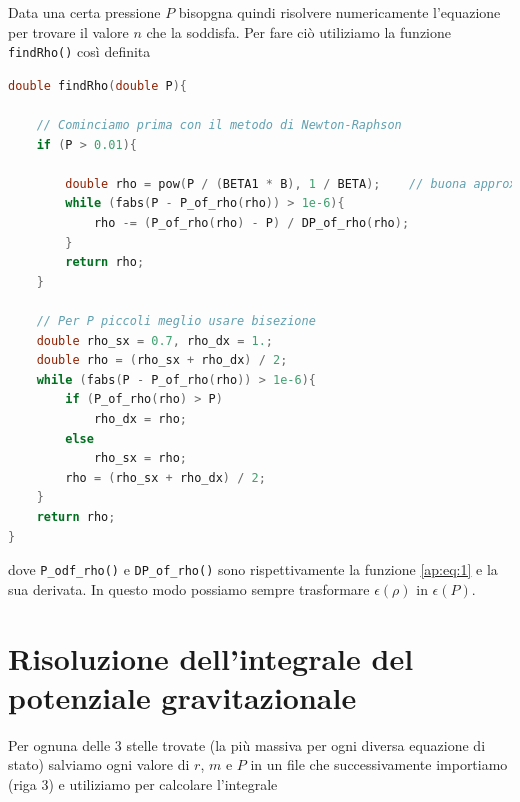 \documentclass[a4paper, titlepage]{article}
\begin{document}
Data una certa pressione $P$ bisopgna quindi risolvere numericamente l'equazione per trovare il valore $n$ che la soddisfa. Per fare ciò utiliziamo la funzione \texttt{findRho()} così definita

\begin{lstlisting}[language=C]
double findRho(double P){

    // Cominciamo prima con il metodo di Newton-Raphson
    if (P > 0.01){

        double rho = pow(P / (BETA1 * B), 1 / BETA);    // buona approx. iniziale
        while (fabs(P - P_of_rho(rho)) > 1e-6){
            rho -= (P_of_rho(rho) - P) / DP_of_rho(rho);
        }
        return rho;
    }

    // Per P piccoli meglio usare bisezione
    double rho_sx = 0.7, rho_dx = 1.;
    double rho = (rho_sx + rho_dx) / 2;
    while (fabs(P - P_of_rho(rho)) > 1e-6){
        if (P_of_rho(rho) > P)
            rho_dx = rho;
        else
            rho_sx = rho;
        rho = (rho_sx + rho_dx) / 2;
    }
    return rho;
}
\end{lstlisting}

dove \texttt{P\_odf\_rho()} e \texttt{DP\_of\_rho()} sono rispettivamente la funzione \ref{ap:eq:1} e la sua derivata. In questo modo possiamo sempre trasformare $\epsilon (\rho)$ in $\epsilon (P)$.



\section{Risoluzione dell'integrale del potenziale gravitazionale} \label{ap:Phi}

Per ognuna delle 3 stelle trovate (la più massiva per ogni diversa equazione di stato) salviamo ogni valore di $r$, $m$ e $P$ in un file che successivamente importiamo (riga 3) e utiliziamo per calcolare l'integrale
\end{document}
